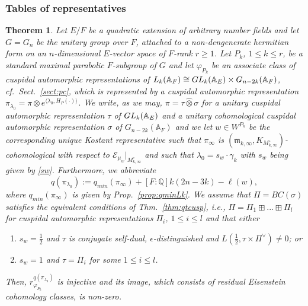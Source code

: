 \documentclass[10pt,a4paper]{amsart}
\newtheorem{thm}{Theorem}
\def\A{\mathbb A}
\def\EE{\mathcal E}
\def\GL{{\rm GL}}
\def\Q{\mathbb Q}
\def\m{\mathfrak m}
\begin{document}
\subsubsection{Tables of representatives}\label{sect:tablesw}

\begin{thm}\label{thm:main}
Let $E/F$ be a quadratic extension of arbitrary number fields and let $G=G_n$ be the unitary group over $F$, attached to a non-dengenerate hermitian form on an $n$-dimensional $E$-vector space of $F$-rank $r\geq 1$. Let $P_k$, $1\leq k\leq r$, be a standard maximal parabolic $F$-subgroup of $G$ and let $\varphi_{P_k} $ be an associate class of cuspidal automorphic representations of $L_k(\A_F)\cong \GL_k(\A_E)\times G_{n-2k}(\A_F)$, cf.\ Sect.\ \ref{sect:pc}, which is represented by a cuspidal automorphic representation $\pi_{\lambda_0}=\pi\otimes e^{\langle \lambda_0, H_P(\cdot)\rangle}$. We write, as we may, $\pi=\tau\hat\otimes\sigma$ for a unitary cuspidal automorphic representation $\tau$ of $\GL_k(\A_E)$ and a unitary cohomological cuspidal automorphic representation $\sigma$ of $G_{n-2k}(\A_F)$ and we let  $w\in W^{P_k}$ be the corresponding unique Kostant representative such that $\pi_\infty$ is $(\m_{k,\infty},K_{M^\circ_{k,\infty}})$-cohomological with respect to $\EE_{\mu_w}|_{M^\circ_{k,\infty}}$ and such that $\lambda_0=s_w\cdot \gamma_k$ with $s_w$ being given by \eqref{sw}. Furthermore, we abbreviate
$$q(\pi_{\lambda_0}):=q_{min}(\pi_\infty) + [F:\Q] k(2n-3k) -\ell(w),$$
where $q_{min}(\pi_\infty)$ is given by Prop.\ \ref{prop:qminLk}.
We assume that $\Pi=BC(\sigma)$ satisfies the equivalent conditions of Thm.\ \ref{thm:qtcusp}, i.e., $\Pi=\Pi_1\boxplus...\boxplus\Pi_l$ for cuspidal automorphic representations $\Pi_i$, $1\leq i\leq l$ and that either
\begin{enumerate}
\item $s_w=\tfrac12$ and $\tau$ is conjugate self-dual, $\epsilon$-distinguished and $L(\tfrac12,\tau\times \Pi^\vee)\neq 0$; or
\item $s_w=1$ and $\tau=\Pi_i$ for some $1\leq i\leq l$.
\end{enumerate}
Then, $r^{q(\pi_{\lambda_0})}_{\varphi_{P_k}}$ is injective and its image, which consists of residual Eisenstein cohomology classes, is non-zero.
\end{thm}
\end{document}
